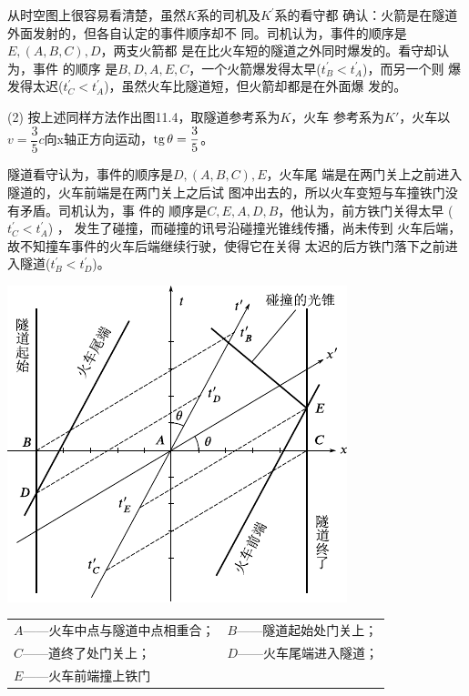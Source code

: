 从时空图上很容易看清楚，虽然$ K $系的司机及$ K ^ { \prime } $系的看守都
确认：火箭是在隧道外面发射的，但各自认定的事件顺序却不
同。司机认为，事件的顺序是$ E, (A, B, C), D $，两支火箭都
是在比火车短的隧道之外同时爆发的。看守却认为，事件
的顺序
是$ B, D, A, E, C $，一个火箭爆发得太早($ t _ { B } ^ { \prime } < t _ { A } ^ { \prime } $)，而另一个则
爆发得太迟($ t _ { C } ^ { \prime } < t _ { A } ^ { \prime } $)，虽然火车比隧道短，但火箭却都是在外面爆
发的。

(2) 按上述同样方法作出图11.4，取隧道参考系为$ K $，火车
参考系为$ K' $，火车以$ v = \dfrac { 3 } { 5 } c $向x轴正方向运动，$  \operatorname{tg} \theta = \dfrac { 3 } { 5 }  $。

隧道看守认为，事件的顺序是$ D, (A, B, C), E $，火车尾
端是在两门关上之前进入隧道的，火车前端是在两门关上之后试
图冲出去的，所以火车变短与车撞铁门没有矛盾。司机认为，事
件的
\clearpage\noindent
顺序是$ C, E, A, D, B $，他认为，前方铁门关得太早
($ t _ { C } ^ { \prime } < t _ { A } ^ { \prime } $)  ，
发生了碰撞，而碰撞的讯号沿碰撞光锥线传播，尚未传到
火车后端，故不知撞车事件的火车后端继续行驶，使得它在关得
太迟的后方铁门落下之前进入隧道($ t _ { B } ^ { \prime } < t _ { D } ^ { \prime } $)。

\begin{figurex}
    \centering
    \includegraphics{figure/fig11.04}
    \caption{}
    \label{fig:11.04}
\end{figurex}

\begin{center}
    \begin{tabular}{ll}
        $ A $——火车中点与隧道中点相重合； & $ B $——隧道起始处门关上； \\
        $ C $——道终了处门关上； & $ D $——火车尾端进入隧道； \\
        $ E $——火车前端撞上铁门 &  \\
    \end{tabular}
\end{center}

